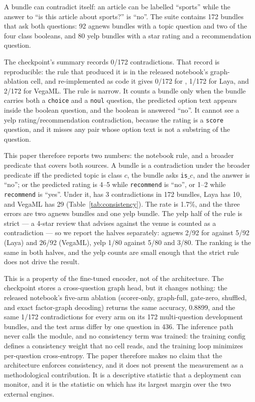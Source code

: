 A bundle can contradict itself: an article can be labelled ``sports'' while the answer to ``is
this article about sports?'' is ``no''. The suite contains 172 bundles that ask both questions:
92 agnews bundles with a topic question and two of the four class booleans, and 80 yelp bundles
with a star rating and a recommendation question.

The checkpoint's summary records 0/172 contradictions. That record is reproducible: the rule that
produced it is in the released notebook's graph-ablation cell, and
re-implemented as code it gives 0/172 for \vsix{}, 1/172 for Laya, and 2/172 for VegaML. The rule
is narrow. It counts a bundle only when the bundle carries both a \texttt{choice} and a
\texttt{noul} question, the predicted option text appears inside the boolean question, and the
boolean is answered ``no''. It cannot see a yelp rating/recommendation contradiction, because the
rating is a \texttt{score} question, and it misses any pair whose option text is not a substring
of the question.

This paper therefore reports two numbers: the notebook rule, and a broader predicate that covers
both sources. A bundle is a contradiction under the broader predicate iff
the predicted topic is class $c$, the bundle asks \texttt{is}$\_c$, and the answer is ``no''; or
the predicted rating is 4--5 while \texttt{recommend} is ``no'', or 1--2 while \texttt{recommend}
is ``yes''. Under it, \vsix{} has 3 contradictions in 172 bundles, Laya has 10, and VegaML has 29
(Table~\ref{tab:consistency}). The \vsix{} rate is 1.7\%, and the three errors are two agnews
bundles and one yelp bundle. The yelp half of the rule is strict --- a 4-star review that advises
against the venue is counted as a contradiction --- so we report the halves separately: agnews
2/92 for \vsix{} against 5/92 (Laya) and 26/92 (VegaML), yelp 1/80 against 5/80 and 3/80. The
ranking is the same in both halves, and the yelp counts are small enough that the strict rule does
not drive the result.

This is a property of the fine-tuned encoder, not of the architecture. The checkpoint stores a
cross-question graph head, but it changes nothing: the released notebook's five-arm ablation
(scorer-only, graph-full, gate-zero, shuffled, and exact factor-graph decoding) returns the same
accuracy, 0.8899, and the same 1/172 contradictions for every arm on its 172 multi-question
development bundles, and the test arms differ by one question in 436. The inference path never calls the module, and no consistency term
was trained: the training config defines a consistency weight that no cell reads, and the training
loop minimizes per-question cross-entropy. The paper therefore makes
no claim that the architecture enforces consistency, and it does not present the measurement as a
methodological contribution. It is a descriptive statistic
that a deployment can monitor, and it is the statistic on which \vsix{} has its largest margin
over the two external engines.

